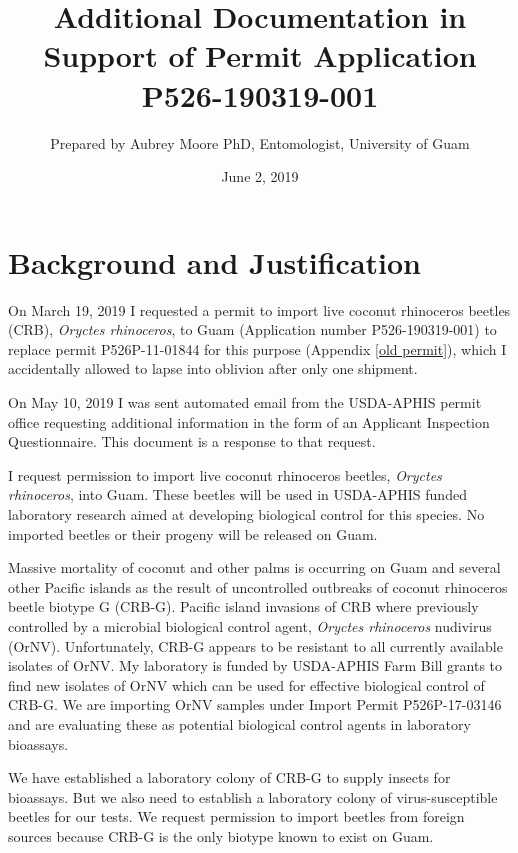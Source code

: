 \documentclass[12pt,english,letterpaper]{scrartcl}
\title{Additional Documentation in Support of Permit Application P526-190319-001}
\author{Prepared by Aubrey Moore PhD, Entomologist, University of Guam}
\date{June 2, 2019}
\begin{document}
\maketitle

\tableofcontents

\section{Background and Justification}
On March 19, 2019 I requested a permit to import live coconut rhinoceros beetles (CRB), \textit{Oryctes rhinoceros}, to Guam (Application number P526-190319-001) to replace permit P526P-11-01844 for this purpose (Appendix \ref{old permit}), which I accidentally allowed to lapse into oblivion after only one shipment.

On May 10, 2019 I was sent automated email from the USDA-APHIS permit office requesting additional information in the form of an Applicant Inspection Questionnaire. This document is a response to that request.

I request permission to import live coconut rhinoceros beetles, \textit{Oryctes rhinoceros}, into Guam. These beetles will be used in USDA-APHIS funded laboratory research aimed at developing biological control for this species. No imported beetles or their progeny will be released on Guam.

Massive mortality of coconut and other palms is occurring on Guam and several other Pacific islands as the result of uncontrolled outbreaks of coconut rhinoceros beetle biotype G (CRB-G). Pacific island invasions of CRB where previously controlled by a microbial biological control agent, \textit{Oryctes rhinoceros} nudivirus (OrNV). Unfortunately, CRB-G appears to be resistant to all currently available isolates of OrNV. My laboratory is funded by USDA-APHIS Farm Bill grants to
find new isolates of OrNV which can be used for effective biological control of CRB-G. We are importing OrNV samples under Import Permit P526P-17-03146 and are evaluating these as potential biological control agents in laboratory bioassays. 

We have established a laboratory colony of CRB-G to supply insects for bioassays. But we also need to establish a laboratory colony of virus-susceptible beetles for our tests. We request permission to import beetles from foreign sources because CRB-G is the only biotype known to exist on Guam.
\end{document}
